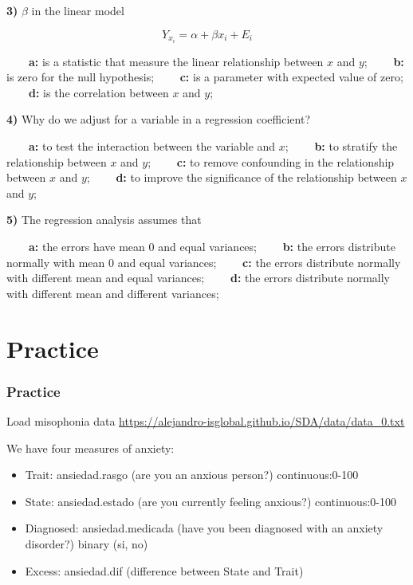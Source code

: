 \documentclass[
]{book}
\providecommand{\tightlist}{%
  \setlength{\itemsep}{0pt}\setlength{\parskip}{0pt}}
\begin{document}
\textbf{3)} \(\beta\) in the linear model

\[Y_{x_i} = \alpha + \beta x_i +E_{i}\]

\textbf{\(\qquad\)a:} is a statistic that measure the linear relationship between \(x\) and \(y\);
\textbf{\(\qquad\)b:} is zero for the null hypothesis;
\textbf{\(\qquad\)c:} is a parameter with expected value of zero;
\textbf{\(\qquad\)d:} is the correlation between \(x\) and \(y\);

\textbf{4)} Why do we adjust for a variable in a regression coefficient?

\textbf{\(\qquad\)a:} to test the interaction between the variable and \(x\);
\textbf{\(\qquad\)b:} to stratify the relationship between \(x\) and \(y\);
\textbf{\(\qquad\)c:} to remove confounding in the relationship between \(x\) and \(y\);
\textbf{\(\qquad\)d:} to improve the significance of the relationship between \(x\) and \(y\);

\textbf{5)} The regression analysis assumes that

\textbf{\(\qquad\)a:} the errors have mean 0 and equal variances;
\textbf{\(\qquad\)b:} the errors distribute normally with mean 0 and equal variances;
\textbf{\(\qquad\)c:} the errors distribute normally with different mean and equal variances;
\textbf{\(\qquad\)d:} the errors distribute normally with different mean and different variances;

\hypertarget{practice-8}{%
\section{Practice}\label{practice-8}}

\hypertarget{practice-9}{%
\subsubsection{Practice}\label{practice-9}}

Load misophonia data \url{https://alejandro-isglobal.github.io/SDA/data/data_0.txt}

We have four measures of anxiety:

\begin{itemize}
\tightlist
\item
  Trait: ansiedad.rasgo (are you an anxious person?) continuous:0-100
\item
  State: ansiedad.estado (are you currently feeling anxious?) continuous:0-100
\item
  Diagnosed: ansiedad.medicada (have you been diagnosed with an anxiety disorder?) binary (si, no)
\item
  Excess: ansiedad.dif (difference between State and Trait)
\end{itemize}
\end{document}
